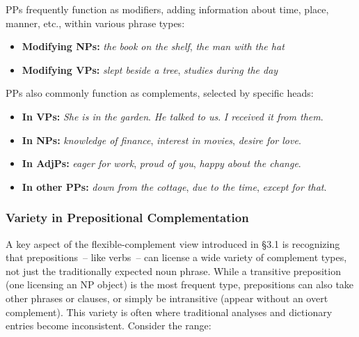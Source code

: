 PPs frequently function as modifiers, adding information about time, place, manner, etc., within various phrase types:

\begin{itemize}
    \item \textbf{Modifying NPs:} \textit{the book {\ob}on the shelf\cb}, \textit{the man {\ob}with the hat\cb}
    \item \textbf{Modifying VPs:} \textit{slept {\ob}beside a tree\cb}, \textit{studies {\ob}during the day\cb}
\end{itemize}

PPs also commonly function as complements, selected by specific heads:

\begin{itemize}
    \item \textbf{In VPs:} \textit{She is {\ob}in the garden\cb}. \textit{He talked {\ob}to us\cb}. \textit{I received it {\ob}from them\cb}.
    \item \textbf{In NPs:} \textit{knowledge {\ob}of finance\cb}, \textit{interest {\ob}in movies\cb}, \textit{desire {\ob}for love\cb}.
    \item \textbf{In AdjPs:} \textit{eager {\ob}for work\cb}, \textit{proud {\ob}of you\cb}, \textit{happy {\ob}about the change\cb}.
    \item \textbf{In other PPs:} \textit{down {\ob}from the cottage\cb}, \textit{due {\ob}to the time\cb}, \textit{except {\ob}for that\cb}.
\end{itemize}

\subsubsection*{Variety in Prepositional Complementation}\label{sec:variety-pp-complementation}

A key aspect of the flexible-complement view introduced in \S3.1 is recognizing that prepositions~-- like verbs~-- can license a wide variety of complement types, not just the traditionally expected noun phrase. While a transitive preposition (one licensing an NP object) is the most frequent type, prepositions can also take other phrases or clauses, or simply be intransitive (appear without an overt complement). This variety is often where traditional analyses and dictionary entries become inconsistent. Consider the range:

